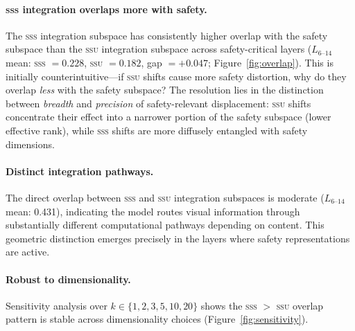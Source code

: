 \documentclass{article}
\newcommand{\ssu}{\textsc{ssu}}
\newcommand{\sss}{\textsc{sss}}
\begin{document}
\paragraph{\sss{} integration overlaps more with safety.}
The \sss{} integration subspace has consistently higher overlap with the safety
subspace than the \ssu{} integration subspace across safety-critical layers
($L_{6\text{--}14}$ mean: \sss{} $= 0.228$, \ssu{} $= 0.182$, gap $=+0.047$;
Figure~\ref{fig:overlap}).  This is initially counterintuitive---if \ssu{} shifts
cause more safety distortion, why do they overlap \emph{less} with the safety
subspace?  The resolution lies in the distinction between \emph{breadth} and
\emph{precision} of safety-relevant displacement: \ssu{} shifts concentrate
their effect into a narrower portion of the safety subspace (lower effective rank),
while \sss{} shifts are more diffusely entangled with safety dimensions.

\paragraph{Distinct integration pathways.}
The direct overlap between \sss{} and \ssu{} integration subspaces is moderate
($L_{6\text{--}14}$ mean: 0.431), indicating the model routes visual information
through substantially different computational pathways depending on content.
This geometric distinction emerges precisely in the layers where safety
representations are active.

\paragraph{Robust to dimensionality.}
Sensitivity analysis over $k \in \{1,2,3,5,10,20\}$ shows the \sss{} $>$ \ssu{}
overlap pattern is stable across dimensionality choices (Figure~\ref{fig:sensitivity}).
\end{document}
